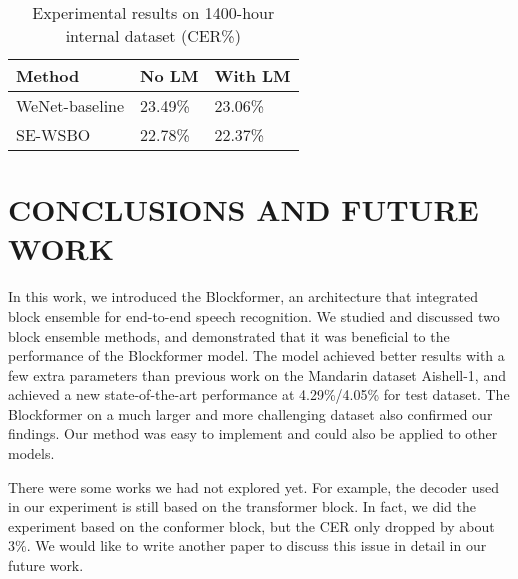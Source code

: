 \documentclass[a4paper]{article}
\begin{document}
\begin{table}[t]
  \caption{Experimental results on 1400-hour internal dataset (CER\%)  }
  \label{tab:word_styles2}
  \centering
  \begin{tabular}{lll}
    \toprule
    \textbf{Method} & \textbf{No LM} & \textbf{With LM} \\
    \midrule
    WeNet-baseline     & 23.49\%      & 23.06\% \\
    SE-WSBO           &  22.78\%      & 22.37\% \\
    \bottomrule
  \end{tabular}
\end{table}


\section{CONCLUSIONS AND FUTURE WORK}
In this work, we introduced the Blockformer, an architecture that
integrated block ensemble for end-to-end speech recognition. We studied and discussed two block ensemble methods, and demonstrated that it was beneficial to the performance of the Blockformer model.
The model achieved better results with a few extra parameters than
previous work on the Mandarin dataset Aishell-1, and achieved a new
state-of-the-art performance at 4.29\%/4.05\% for test dataset.
The Blockformer on a much larger and more challenging dataset also confirmed our findings. Our method was easy to implement and could also be applied to other models. 

There were some works we had not explored yet. For example, the decoder used in our experiment is still based on the transformer block. In fact, we did the experiment based on the conformer block, but the CER only dropped by about 3\%. We would like to write another paper to discuss this issue in detail in our future work.






\end{document}
